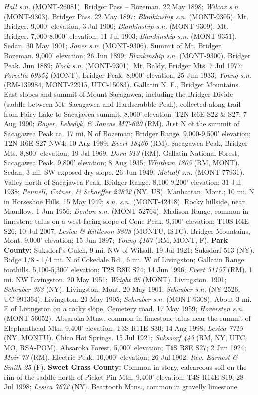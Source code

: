 \textit{Hall s.n.} (MONT-26081).  Bridger Pass – Bozeman. 22 May 1898; \textit{Wilcox s.n.} (MONT-9303).  Bridger Pass. 22 May 1897; \textit{Blankinship s.n.} (MONT-9305).  Mt. Bridger. 9,000’ elevation; 3 Jul 1900; \textit{Blankinship s.n.} (MONT-9309).  Mt. Bridger. 7,000-8,000’ elevation; 11 Jul 1903; \textit{Blankinship s.n.} (MONT-9351).  Sedan. 30 May 1901; \textit{Jones s.n.} (MONT-9306).  Summit of Mt. Bridger, Bozeman. 9,000’ elevation; 26 Jun 1899; \textit{Blankinship s.n.} (MONT-9300).  Bridger Peak. Jun 1889; \textit{Kock s.n.} (MONT-9301).  Mt. Baldy, Bridger Mts.  7 Jul 1977; \textit{Forcella 69354} (MONT).  Bridger Peak. 8,900’ elevation; 25 Jun 1933; \textit{Young s.n.} (RM-139984, MONT-22915, UTC-15083).  Gallatin N. F., Bridger Mountains.  East slopes and summit of Mount Sacagawea, including the Bridger Divide (saddle between Mt. Sacagawea and Hardscrabble Peak); collected along trail from Fairy Lake to Sacajawea summit. 8,000’ elevation; T2N R6E S22 \& S27; 7 Aug 1990; \textit{Bayer, Lebedyk, \& Joncas MT-620} (RM).  Just N of the summit of Sacagawea Peak ca. 17 mi. N of Bozeman; Bridger Range. 9,000-9,500’ elevation; T2N R6E S27 NW4; 10 Aug 1989; \textit{Evert 18466} (RM).  Sacagawea Peak, Bridger Mts. 8,800’ elevation; 19 Jul 1969; \textit{Dorn 913} (RM). Gallatin National Forest, Sacagawea Peak. 9,800’ elevation; 8 Aug 1935; \textit{Whitham 1805} (RM, MONT).  Sedan, 3 mi. SW exposed dry slope. 26 Jun 1949; \textit{Metcalf s.n.} (MONT-77931).  Valley north of Sacajawea Peak, Bridger Range. 8,100-9,200’ elevation; 31 Jul 1938; \textit{Pennell, Cotner, \& Schaeffer 23832} (NY, US).  Manhattan, Mont.; 10 mi. N in Horseshoe Hills. 15 May 1949; \textit{s.n. s.n.} (MONT-42418).  Rocky hillside, near Maudlow. 1 Jun 1956; \textit{Denton s.n.} (MONT-52764).  Madison Range; common in limestone talus on a west-facing slope of Cone Peak. 9,600’ elevation; T10S R4E S26; 10 Jul 2007; \textit{Lesica \& Kittleson 9808} (MONTU, ISTC).  Bridger Mountains, Mont. 9,000’ elevation; 15 Jun 1897; \textit{Young 4167} (RM, MONT, F).  \textbf{Park County:}  Suksdorf's Gulch, 9 mi. NW of Wilsall. 19 Jul 1921; Suksdorf 513 (NY).  Ridge 1/8 - 1/4 mi. N of Cokedale Rd., 6 mi. W of Livingston; Gallatin Range foothills. 5,100-5,300’ elevation; T2S R8E S24; 14 Jun 1996; \textit{Evert 31157} (RM).  1 mi. NW Livingston. 20 May 1951; \textit{Wright 25} (MONT).  Livingston. 1901; \textit{Scheuber 363} (NY).  Livingston, Mont. 20 May 1901; \textit{Scheuber s.n.} (NY-2526, UC-991364).  Livingston. 20 May 1905; \textit{Scheuber s.n.} (MONT-9308).  About 3 mi. E of Livingston on a rocky slope, Cemetery road. 17 May 1959; \textit{Hoversten s.n.} (MONT-56052).  Absaroka Mtns., common in limestone talus near the summit of Elephanthead Mtn.  9,400’ elevation; T3S R11E S30; 14 Aug 1998; \textit{Lesica 7719} (NY, MONTU).  Chico Hot Springs. 15 Jul 1921; \textit{Suksdorf 443} (RM, NY, UTC, MO, RSA-POM).  Absaroka Forest. 5,000’ elevation; T6S R8E S27; 2 Jun 1924; \textit{Moir 73} (RM).  Electric Peak. 10,000’ elevation; 26 Jul 1902; \textit{Rev. Earnest \& Smith 25} (F).  \textbf{Sweet Grass County:}  Common in stony, calcareous soil on the rim of the saddle north of Picket Pin Mtn. 9,400’ elevation; T4S R14E S19; 28 Jul 1998; \textit{Lesica 7672} (NY).  Beartooth Mtns., common in gravelly limestone 